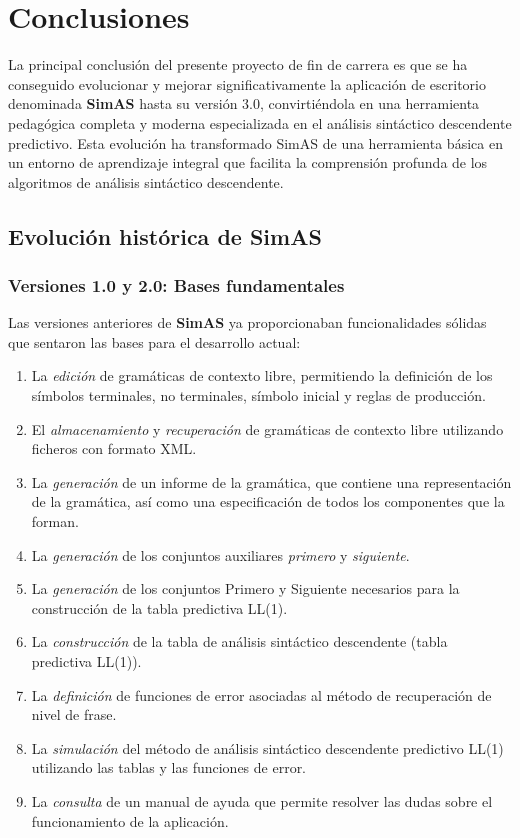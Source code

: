 \chapter{Conclusiones}

La principal conclusión del presente proyecto de fin de carrera es que se ha conseguido evolucionar y mejorar significativamente la aplicación de escritorio denominada \textbf{SimAS} hasta su versión 3.0, convirtiéndola en una herramienta pedagógica completa y moderna especializada en el análisis sintáctico descendente predictivo. Esta evolución ha transformado SimAS de una herramienta básica en un entorno de aprendizaje integral que facilita la comprensión profunda de los algoritmos de análisis sintáctico descendente.

\section{Evolución histórica de SimAS}

\subsection{Versiones 1.0 y 2.0: Bases fundamentales}

Las versiones anteriores de \textbf{SimAS} ya proporcionaban funcionalidades sólidas que sentaron las bases para el desarrollo actual:

\begin{enumerate}
\item La \textit{edición} de gramáticas de contexto libre, permitiendo la definición de los símbolos terminales, no terminales, símbolo inicial y reglas de producción.
\item El \textit{almacenamiento} y \textit{recuperación} de gramáticas de contexto libre utilizando ficheros con formato XML.
\item La \textit{generación} de un informe de la gramática, que contiene una representación de la gramática, así como una especificación de todos los componentes que la forman.
\item La \textit{generación} de los conjuntos auxiliares \textit{primero} y \textit{siguiente}.
\item La \textit{generación} de los conjuntos Primero y Siguiente necesarios para la construcción de la tabla predictiva LL(1).
\item La \textit{construcción} de la tabla de análisis sintáctico descendente (tabla predictiva LL(1)).
\item La \textit{definición} de funciones de error asociadas al método de recuperación de nivel de frase.
\item La \textit{simulación} del método de análisis sintáctico descendente predictivo LL(1) utilizando las tablas y las funciones de error.
\item La \textit{consulta} de un manual de ayuda que permite resolver las dudas sobre el funcionamiento de la aplicación.
\end{enumerate}


